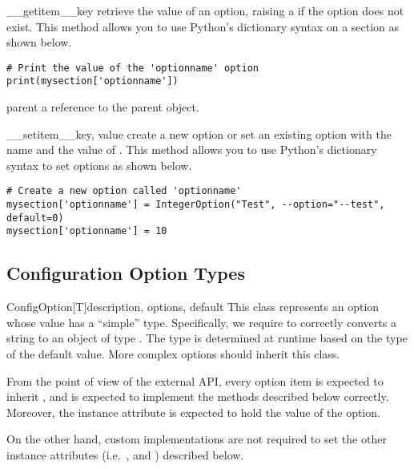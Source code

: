 \begin{methoddesc}[ConfigSection]{__getitem__}{key}
  retrieve the value of an option, raising a  if the option
  does not exist. This method allows you to use Python's dictionary syntax on a
  section as shown below.
\begin{verbatim}
# Print the value of the 'optionname' option
print(mysection['optionname'])
\end{verbatim}
\end{methoddesc}

\begin{memberdesc}[ConfigSection]{parent}
a reference to the parent  object.
\end{memberdesc}

\begin{methoddesc}[ConfigSection]{__setitem__}{key, value}
create a new option or set an existing option with the name  and
the value of .  This method allows you to use Python's 
dictionary syntax to set options as shown below.
\begin{verbatim}
# Create a new option called 'optionname'
mysection['optionname'] = IntegerOption("Test", --option="--test", default=0)
mysection['optionname'] = 10
\end{verbatim}
\end{methoddesc}

\subsection{Configuration Option Types}

\begin{classdesc}{ConfigOption[T]}{description, options, default}
  This class represents an option whose value has a ``simple'' type.
  Specifically, we require  to correctly converts a string 
  to an object of type . The type is determined at runtime based on
  the type of the default value. More complex options should inherit this class.

  From the point of view of the external API, every option item is expected to
  inherit , and is expected to implement the methods described
  below correctly. Moreover, the instance attribute  is expected
  to hold the value of the option.

  On the other hand, custom  implementations are not required
  to set the other instance attributes (i.e.\ ,
   and ) described below.
\end{classdesc}

